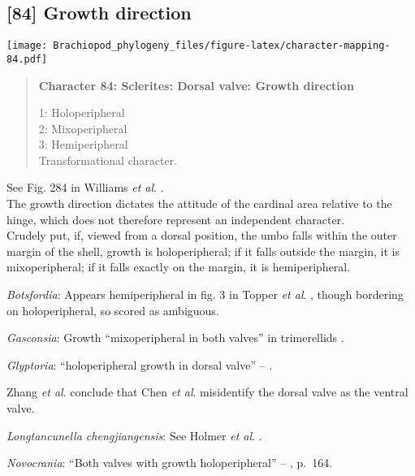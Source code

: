 \documentclass[openany]{book}
\theoremstyle{definition}
\theoremstyle{definition}
\theoremstyle{definition}
\theoremstyle{remark}
\begin{document}
\subsection*{{[}84{]} Growth direction}\label{growth-direction}

\texttt{[image: Brachiopod\_phylogeny\_files/figure-latex/character-mapping-84.pdf]}

\begin{quote}
\textbf{Character 84: Sclerites: Dorsal valve: Growth direction}

1: Holoperipheral\\
2: Mixoperipheral\\
3: Hemiperipheral\\
Transformational character.
\end{quote}

See Fig. 284 in Williams \emph{et al}.
\citeyearpar{Williams1997Introduction}.\\
The growth direction dictates the attitude of the cardinal area relative
to the hinge, which does not therefore represent an independent
character.\\
Crudely put, if, viewed from a dorsal position, the umbo falls within
the outer margin of the shell, growth is holoperipheral; if it falls
outside the margin, it is mixoperipheral; if it falls exactly on the
margin, it is hemiperipheral.

\hypertarget{Botsfordia-coding-84}{}
\emph{Botsfordia}: Appears hemiperipheral in fig. 3 in Topper \emph{et
al}. \citeyearpar{Topper2013Reappraisalof}, though bordering on
holoperipheral, so scored as ambiguous.

\hypertarget{Gasconsia-coding-84}{}
\emph{Gasconsia}: Growth ``mixoperipheral in both valves'' in
trimerellids \citep{Williams2000LinguliformeaCraniiformea, Popov1997}.

\hypertarget{Glyptoria-coding-84}{}
\emph{Glyptoria}: ``holoperipheral growth in dorsal valve'' --
\citet{Williams2007Supplement}.

Zhang \emph{et al}. \citeyearpar{Zhang2009Architectureand} conclude that
Chen \emph{et al}. \citeyearpar{Chen2007Reinterpretationof} misidentify
the dorsal valve as the ventral valve.

\hypertarget{Longtancunella_chengjiangensis-coding-84}{}
\emph{Longtancunella chengjiangensis}: See Holmer \emph{et al}.
\citeyearpar{Holmer2008TheEarly}.

\hypertarget{Novocrania-coding-84}{}
\emph{Novocrania}: ``Both valves with growth holoperipheral'' --
\citet{Williams2000LinguliformeaCraniiformea}, p.~164.
\end{document}
